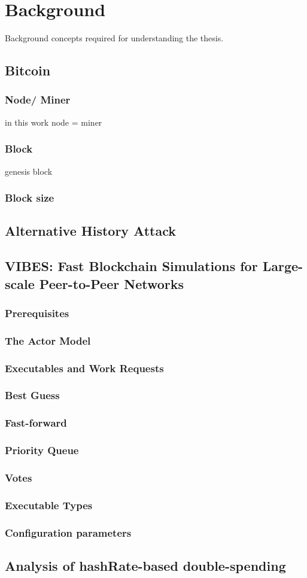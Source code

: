 \chapter{Background} 
\label{chapter:background}

Background concepts required for understanding the thesis. 

\section{Bitcoin}
\subsection{Node/ Miner}
in this work node = miner
\subsection{Block}
genesis block
\subsection{Block size}

\section{Alternative History Attack}

\section{VIBES: Fast Blockchain Simulations for Large-scale Peer-to-Peer
Networks}
\subsection{Prerequisites}
\subsection{The Actor Model}
\subsection{Executables and Work Requests}
\subsection{Best Guess}
\subsection{Fast-forward}
\subsection{Priority Queue}
\subsection{Votes}
\subsection{Executable Types}
\subsection{Configuration parameters}

\section{Analysis of hashRate-based double-spending}
